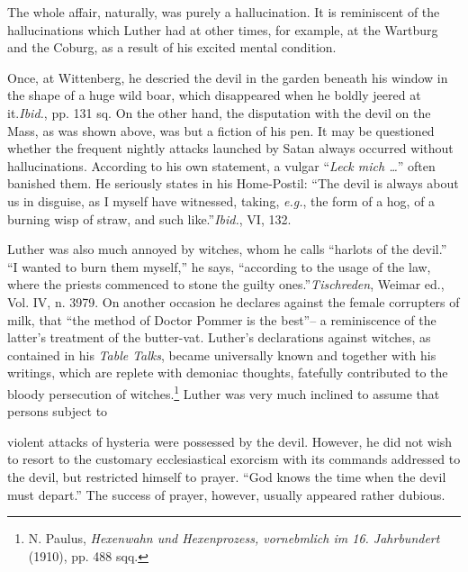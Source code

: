 The whole affair, naturally, was purely a hallucination. It is
reminiscent of the hallucinations which Luther had at other times, for
example, at the Wartburg and the Coburg, as a result of his excited
mental condition.

Once, at Wittenberg, he descried the devil in the garden beneath
his window in the shape of a huge wild boar, which disappeared when
he boldly jeered at it.\textit{Ibid.}, pp. 131 sq.
 On the other hand, the disputation with the
devil on the Mass, as was shown above, was but a fiction of his pen.
It may be questioned whether the frequent nightly attacks launched
by Satan always occurred without hallucinations. According to his
own statement, a vulgar “\textit{Leck mich \dots}” often banished them. He
seriously states in his Home-Postil: “The devil is always about us in
disguise, as I myself have witnessed, taking, \textit{e.g.}, the form of a hog, of
a burning wisp of straw, and such like.”\textit{Ibid.}, VI, 132.


Luther was also much annoyed by witches, whom he calls “harlots of the
devil.” “I wanted to burn them myself,” he says, “according to the usage
of the law, where the priests commenced to stone the
guilty ones.”\textit{Tischreden}, Weimar ed., Vol. IV, n. 3979.
 On another occasion he declares against the female
corrupters of milk, that “the method of Doctor Pommer is the best”--
a reminiscence of the latter’s treatment of the butter-vat. Luther’s
declarations against witches, as contained in his \textit{Table Talks}, became
universally known and together with his writings, which are replete
with demoniac thoughts, fatefully contributed to the bloody persecution
of witches.\footnote
{N. Paulus, \textit{Hexenwahn und Hexenprozess, vornebmlich im 16. Jahrbundert} (1910),
pp. 488 sqq.}
Luther was very much inclined to assume that persons subject to

violent attacks of hysteria were possessed by the devil. However, he
did not wish to resort to the customary ecclesiastical exorcism with
its commands addressed to the devil, but restricted himself to prayer.
“God knows the time when the devil must depart.” The success of
prayer, however, usually appeared rather dubious.

